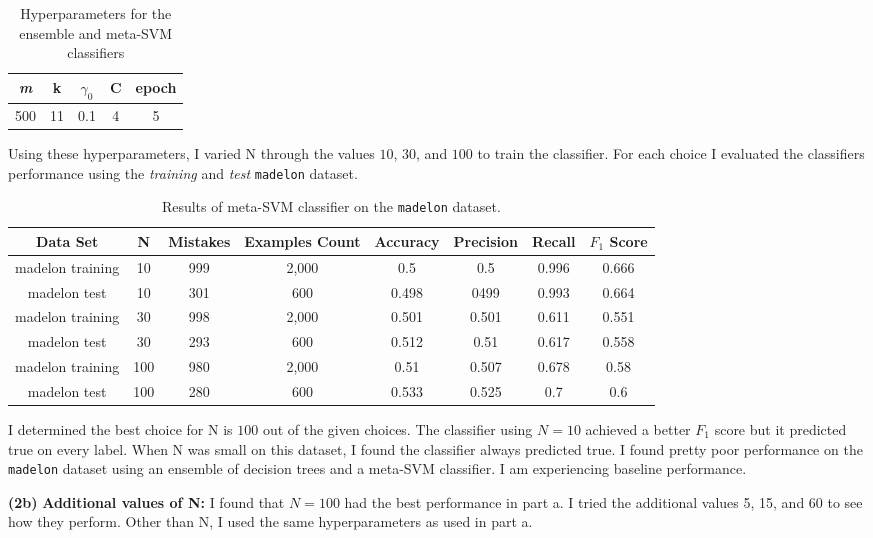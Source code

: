 \documentclass[11pt]{article}
\renewcommand\part[1]{\vspace{.10in}\textbf{(#1)}}
\begin{document}
\begin{table}[H]
\centering
{\renewcommand{\arraystretch}{1.2}%
\begin{tabular}{| c | c | c | c | c |}
\hline
\textit{m} & k & $\gamma_0$ & C & epoch\\
\hline
500 & 11 & 0.1 & 4 & 5\\ \hline
\end{tabular}}
\caption{Hyperparameters for the ensemble and meta-SVM classifiers}
\end{table}

Using these hyperparameters, I varied N through the values $10$, $30$, and $100$ to train the classifier. For each choice I evaluated the classifiers performance using the \textit{training} and \textit{test} {\tt madelon} dataset.

 \begin{table}[H]
\centering
{\renewcommand{\arraystretch}{1.2}%
\begin{tabular}{| c | c | c | c | c | c | c | c |}
\hline
Data Set & N & Mistakes & Examples Count & Accuracy & Precision & Recall & $F_1$ Score\\
\hline
madelon training & 10 & 999 & 2,000 & 0.5 & 0.5 & 0.996 & 0.666\\ \hline
madelon test & 10 & 301 & 600 & 0.498 & 0499 & 0.993 & 0.664\\ \hline
madelon training & 30 & 998 & 2,000 & 0.501 & 0.501 & 0.611 & 0.551\\ \hline
madelon test & 30 & 293 & 600 & 0.512 & 0.51 & 0.617 & 0.558\\ \hline
madelon training & 100 & 980 & 2,000 & 0.51 & 0.507 & 0.678 & 0.58\\ \hline
madelon test & 100 & 280 & 600 & 0.533 & 0.525 & 0.7 & 0.6\\ \hline
\end{tabular}}
\caption{Results of meta-SVM classifier on the {\tt madelon} dataset.}
\end{table}

I determined the best choice for N is $100$ out of the given choices. The classifier using $N = 10$ achieved a better $F_1$ score but it predicted true on every label. When N was small on this dataset, I found the classifier always predicted true. I found pretty poor performance on the {\tt madelon} dataset using an ensemble of decision trees and a meta-SVM classifier. I am experiencing baseline performance.

\part{2b} \textbf{Additional values of N:} I found that $N = 100$ had the best performance in part a. I tried the additional values 5, 15, and 60 to see how they perform. Other than N, I used the same hyperparameters as used in part a.
\end{document}
